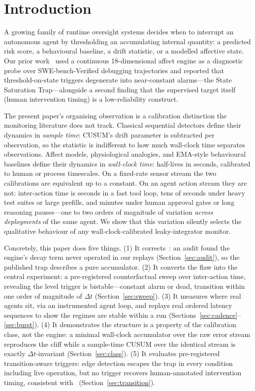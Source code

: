 \section{Introduction}
\label{sec:intro}

A growing family of runtime oversight systems decides when to interrupt an
autonomous agent by thresholding an accumulating internal quantity: a predicted
risk score, a behavioural baseline, a drift statistic, or a modelled affective
state. Our prior work~\cite{P1} used a continuous 18-dimensional affect engine
as a diagnostic probe over SWE-bench-Verified debugging trajectories and
reported that threshold-on-state triggers degenerate into near-constant
alarms---the State Saturation Trap---alongside a second finding that the
supervised target itself (human intervention timing) is a low-reliability
construct.

The present paper's organising observation is a calibration distinction the
monitoring literature does not track. Classical sequential detectors define
their dynamics in \emph{sample time}: CUSUM's drift parameter is subtracted per
observation, so the statistic is indifferent to how much wall-clock time
separates observations. Affect models, physiological analogies, and EMA-style
behavioural baselines define their dynamics in \emph{wall-clock time}:
half-lives in seconds, calibrated to human or process timescales. On a
fixed-rate sensor stream the two calibrations are equivalent up to a constant.
On an agent action stream they are not: inter-action time is seconds in a fast
tool loop, tens of seconds under heavy test suites or large prefills, and
minutes under human approval gates or long reasoning pauses---one to two orders
of magnitude of variation \emph{across deployments} of the same agent. We show
that this variation silently selects the qualitative behaviour of any
wall-clock-calibrated leaky-integrator monitor.

Concretely, this paper does five things. (1) It corrects~\cite{P1}: an audit
found the engine's decay term never operated in our replays
(Section~\ref{sec:audit}), so the published trap describes a pure accumulator.
(2) It converts the flaw into the central experiment: a pre-registered
counterfactual sweep over inter-action time, revealing the level trigger is
bistable---constant alarm or dead, transition within one order of magnitude of
$\Delta t$ (Section~\ref{sec:sweep}). (3) It measures where real agents sit, via
an instrumented agent loop, and replays real ordered latency sequences to
show the regimes are stable within a run
(Sections~\ref{sec:cadence}--\ref{sec:burst}). (4) It demonstrates the
structure is a property of the calibration class, not the engine: a minimal
wall-clock accumulator over the raw error stream reproduces the cliff while a
sample-time CUSUM over the identical stream is exactly $\Delta t$-invariant
(Section~\ref{sec:class}). (5) It evaluates pre-registered transition-aware
triggers: edge detection escapes the trap in every condition including live
operation, but no trigger recovers human-annotated intervention timing,
consistent with~\cite{P1} (Section~\ref{sec:transition}).

